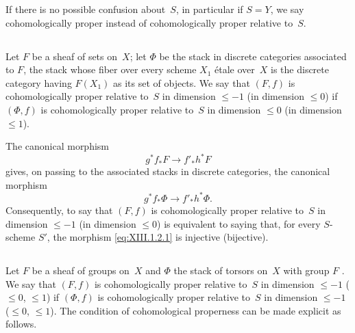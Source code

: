 If there is no possible confusion about~$S$, in particular if $S=Y$,
we say cohomologically proper instead of cohomologically proper
relative to~$S$.

\subsection{}
\label{XIII.1.2}
Let $F$ be a sheaf of sets on~$X$; let $\Phi$ be the stack in
discrete categories associated to $F$, \ie the stack whose
fiber over every scheme $X_1$ \'etale over~$X$ is the
discrete category having $F(X_1)$ as its set of objects. We
say that $(F,f)$ is cohomologically proper relative to~$S$ in
dimension $\leqslant -1$ (\resp in dimension $\leqslant 0$) if $(\Phi,
f)$ is cohomologically proper relative to~$S$ in dimension
$\leqslant 0$ (\resp in dimension $\leqslant 1$).

The
canonical morphism
\begin{equation*}
\label{eq:XIII.1.2.1}
\tag{\thesubsection.1} { g^* f_* F \to f'_* h^* F }
\end{equation*}
gives, on passing to the associated stacks in discrete
categories, the canonical morphism
$$
g^* f_* \Phi \to f'_* h^* \Phi \text{.}
$$
Consequently, to say that $(F,f)$ is cohomologically proper relative
to~$S$ in dimension $\leqslant -1$ (\resp in dimension $\leqslant
0$) is equivalent to saying that, for every $S$-scheme $S'$, the
morphism \eqref{eq:XIII.1.2.1} is injective (\resp bijective).

\subsection{}
\label{XIII.1.3}
Let $F$ be a sheaf of groups on~$X$ and $\Phi$ the stack of
torsors on~$X$ with group $F$ \cite[II 2.3.2]{XIII.1}. We say that $(F,f)$ is
cohomologically proper relative to~$S$ in dimension
$\leqslant -1$ (\resp $\leqslant 0$, \resp $\leqslant 1$) if
$(\Phi,f)$ is cohomologically proper relative to~$S$ in
dimension $\leqslant -1$ (\resp $\leqslant 0$, \resp $\leqslant
1$). The condition of cohomological properness can be made explicit
as follows.

